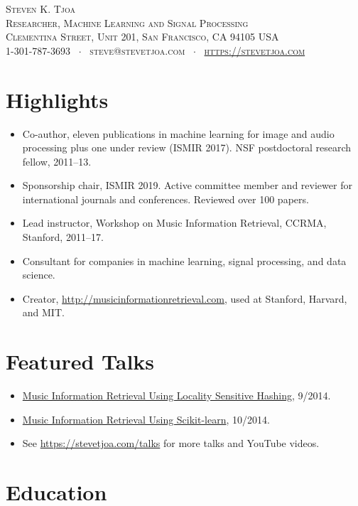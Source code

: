 \documentclass[10pt,letterpaper]{article}
\newcommand{\namestyle}{\huge \scshape}
\newcommand{\addressstyle}{\color{addresscolor} \footnotesize \rmfamily \upshape}
\begin{document}
\begin{center}
    \namestyle Steven K. Tjoa \\[0.2em]
    \addressstyle Researcher, Machine Learning and Signal Processing\\
    \addressstyle 19 Clementina Street, Unit 201, San Francisco, CA 94105 USA \\
    1-301-787-3693 \ $\cdot$ \ steve@stevetjoa.com \ $\cdot$ \ \url{https://stevetjoa.com}
\end{center}


\small
\section*{Highlights}

\begin{itemize}
    \item Co-author, eleven publications in machine learning for image and audio processing plus one under review (ISMIR 2017). NSF postdoctoral research fellow, 2011--13. 
    \item Sponsorship chair, ISMIR 2019. Active committee member and reviewer for international journals and conferences. Reviewed over 100 papers.
    \item Lead instructor, Workshop on Music Information Retrieval, CCRMA, Stanford, 2011--17.
    \item Consultant for companies in machine learning, signal processing, and data science. 
    \item Creator, \url{http://musicinformationretrieval.com}, used at Stanford, Harvard, and MIT.
\end{itemize}


\section*{Featured Talks}

\begin{itemize}
    \item \href{https://youtu.be/SghMq1xBJPI}{Music Information Retrieval Using Locality Sensitive Hashing}, 9/2014. 
    \item \href{https://youtu.be/oGGVvTgHMHw}{Music Information Retrieval Using Scikit-learn}, 10/2014. 
    \item See \url{https://stevetjoa.com/talks} for more talks and YouTube videos.
\end{itemize}

\section*{Education}
\end{document}
